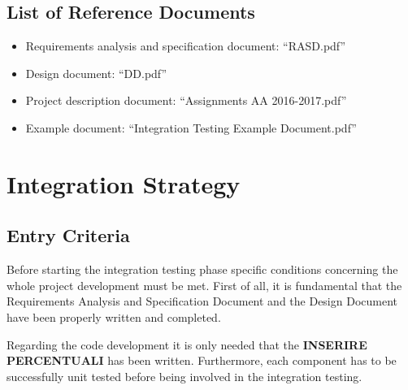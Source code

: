 \documentclass[english]{article}
\begin{document}
\subsection{List of Reference Documents}

\begin{itemize}
	\item{Requirements analysis and specification document: “RASD.pdf”}
	\item{Design document: “DD.pdf”}
	\item{Project description document: “Assignments AA 2016-2017.pdf”}
	\item{Example document: “Integration Testing Example Document.pdf”}
\end{itemize}

\section{Integration Strategy}

\subsection{Entry Criteria}

Before starting the integration testing phase specific conditions concerning the whole project development must be met.
First of all, it is fundamental that the Requirements Analysis and Specification Document and the Design Document have been properly written and completed.

Regarding the code development it is only needed that the \textbf{INSERIRE PERCENTUALI} has been written. Furthermore, each component has to be successfully unit tested before being involved in the integration testing.

\end{document}
